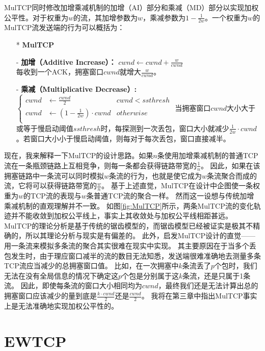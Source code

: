 \documentclass[winfonts]{njuthesis}
\begin{document}
MulTCP\cite{crowcroft1998differentiated}同时修改加增乘减机制的加增（AI）部分和乘减（MD）部分以实现加权公平性。对于权重为$w$的流，其加增参数为$w$，乘减参数为$1-\frac{1}{2w}$。一个权重为$w$的MulTCP流发送端的行为可以概括为：

\begin{itemize}
  \item[*] \textbf{\large MulTCP}
  \item[-] {\bf 加增（Additive Increase）：} $cwnd \leftarrow cwnd + \frac{w}{cwnd}$ \\
  每收到一个ACK，拥塞窗口$cwnd$就增大$\frac{w}{cwnd}$。
  \item[-] {\bf 乘减（Multiplicative Decrease）:}
  $ \left\{
  \begin{aligned}
  cwnd & \leftarrow \frac{cwnd}{2} & cwnd < ssthresh \\
  cwnd & \leftarrow \left( 1 - \frac{1}{2w} \right) \cdot cwnd & otherwise\\
  \end{aligned}
  \right.$ 
  当拥塞窗口$cwnd$大小大于或等于慢启动阈值$ssthresh$时，每探测到一次丢包，窗口大小就减少$\frac{1}{2w} \cdot cwnd$。若窗口大小小于慢启动阈值，则每对于每次丢包，窗口直接减半。
\end{itemize}
现在，我来解释一下MulTCP的设计思路。如果$n$条使用加增乘减机制的普通TCP流在一条瓶颈链路上互相竞争，则每一条都会获得链路带宽的$\frac{1}{n}$。
因此，如果在该拥塞链路中一条流可以同时模拟$w$条流的行为，也就是使它成为$w$条流聚合而成的流，它将可以获得链路带宽的$\frac{w}{n}$。
基于上述直觉，MulTCP在设计中企图使一条权重为$w$的TCP流的表现与$w$条普通TCP流的聚合一样。
然而这一设想与传统加增乘减机制的直观理解\cite{chiu1989analysis}并不一致。
如图\ref{fig:MulTCP}所示，两条MulTCP流的变化轨迹并不能收敛到加权公平线上，事实上其收敛处与加权公平线相距甚远。
MulTCP的理论分析是基于传统的锯齿模型的，而锯齿模型已经被证实是极其不精确的\cite{alizadeh2011analysis}，所以其理论分析与现实是有偏差的。
此外，启发MulTCP设计的直觉——用一条流来模拟多条流的聚合其实很难在现实中实现。
其主要原因在于当多个丢包发生时，由于理应窗口减半的流的数目无法知悉，发送端很难准确地去测量多条TCP流应当减少的总拥塞窗口值。
比如，在一次拥塞中$k$条流丢了$p$个包时，我们无法在没有全局信息的情况下确定这$p$个包是分别属于这$k$条流，还是只属于1条流。
因此，即使每条流的窗口大小相同均为$cwnd$，最终我们还是无法计算出总的拥塞窗口应该减少的量到底是$\frac{k \cdot cwnd}{2}$还是$\frac{cwnd}{2}$。
我将在第三章中指出MulTCP事实上是无法准确地实现加权公平性的。

\section{EWTCP}
\end{document}
